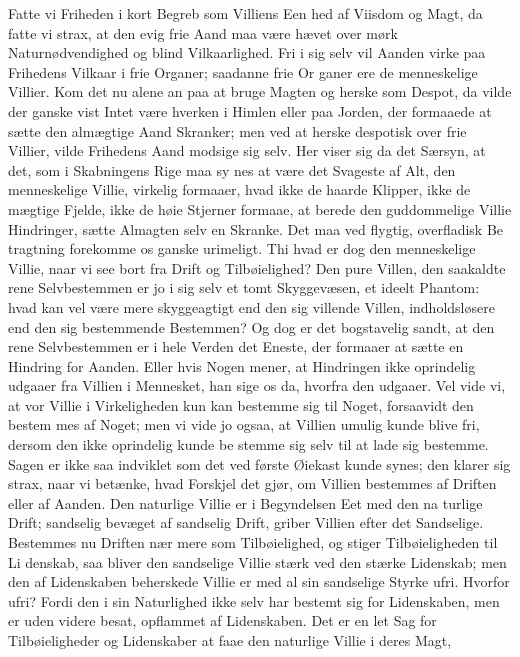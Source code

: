 \documentclass[12pt]{book}
\newcommand{\opage}[1]{\marginnote{\footnotesize\textit{[#1]}}}
\begin{document}
Fatte vi Friheden i kort Begreb som Villiens Een\-%
hed af Viisdom og Magt, da fatte vi strax, at den evig
frie Aand maa være hævet over mørk Naturnødvendighed
og blind Vilkaarlighed. Fri i sig selv vil Aanden virke
paa Frihedens Vilkaar i frie Organer; saadanne frie Or\-%
ganer ere de menneskelige Villier. Kom det nu alene
an paa at bruge Magten og herske som Despot, da
vilde der ganske vist Intet være hverken i Himlen eller
paa Jorden, der formaaede at sætte den almægtige Aand
Skranker; men ved at herske despotisk over frie Villier,
vilde Frihedens Aand modsige sig selv. Her viser sig
da det Særsyn, at det, som i Skabningens Rige maa sy\-%
nes at være det Svageste af Alt, den menneskelige Villie,
virkelig formaaer, hvad ikke de haarde Klipper, ikke de
mægtige Fjelde, ikke de høie Stjerner formaae, at berede
den guddommelige Villie Hindringer, sætte Almagten
selv en Skranke. Det maa ved flygtig, overfladisk Be\-%
tragtning forekomme os ganske urimeligt. Thi hvad er
dog den menneskelige Villie, naar vi see bort fra Drift
og Tilbøielighed? Den pure Villen, den saakaldte rene
\opage{10}\setcounter{footnote}{0}%
Selvbestemmen er jo i sig selv et tomt Skyggevæsen, et
ideelt Phantom: hvad kan vel være mere skyggeagtigt
end den sig villende Villen, indholdsløsere end den sig
bestemmende Bestemmen? Og dog er det bogstavelig
sandt, at den rene Selvbestemmen er i hele Verden det
Eneste, der formaaer at sætte en Hindring for Aanden.
Eller hvis Nogen mener, at Hindringen ikke oprindelig
udgaaer fra Villien i Mennesket, han sige os da, hvorfra
den udgaaer. Vel vide vi, at vor Villie i Virkeligheden
kun kan bestemme sig til Noget, forsaavidt den bestem\-%
mes af Noget; men vi vide jo ogsaa, at Villien umulig
kunde blive fri, dersom den ikke oprindelig kunde be\-%
stemme sig selv til at lade sig bestemme. Sagen er ikke
saa indviklet som det ved første Øiekast kunde synes;
den klarer sig strax, naar vi betænke, hvad Forskjel det
gjør, om Villien bestemmes af Driften eller af Aanden.
Den naturlige Villie er i Begyndelsen Eet med den na\-%
turlige Drift; sandselig bevæget af sandselig Drift, griber
Villien efter det Sandselige. Bestemmes nu Driften nær\-%
mere som Tilbøielighed, og stiger Tilbøieligheden til Li\-%
denskab, saa bliver den sandselige Villie stærk ved den
stærke Lidenskab; men den af Lidenskaben beherskede
Villie er med al sin sandselige Styrke ufri. Hvorfor ufri?
Fordi den i sin Naturlighed ikke selv har bestemt sig
for Lidenskaben, men er uden videre besat, opflammet
af Lidenskaben. Det er en let Sag for Tilbøieligheder
og Lidenskaber at faae den naturlige Villie i deres Magt,
\end{document}

